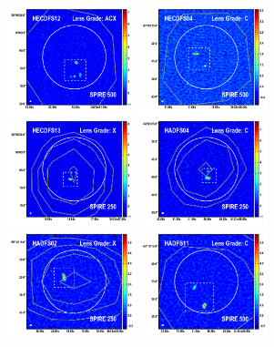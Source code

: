 \documentclass[iop]{emulateapj}
\begin{document}
\begin{figure}[!tbp]
\begin{centering}
\includegraphics[width=0.331\textwidth]{HECDFS12_870_500.pdf}
\includegraphics[width=0.331\textwidth]{HECDFS04_870_500.pdf}
\includegraphics[width=0.331\textwidth]{HECDFS13_870_250.pdf}
\includegraphics[width=0.331\textwidth]{HADFS04_870_250.pdf}
\includegraphics[width=0.331\textwidth]{HADFS02_870_250.pdf}
\includegraphics[width=0.331\textwidth]{HADFS11_870_500.pdf}

\end{centering}
\end{figure}
\end{document}
